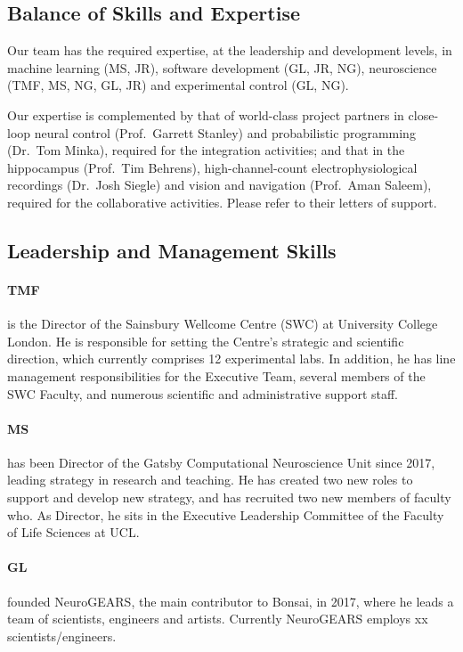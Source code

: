 \subsection*{Balance of Skills and Expertise}

Our team has the required expertise, at the leadership and development levels,
in machine learning (MS, JR), software development (GL, JR, NG), neuroscience
(TMF, MS, NG, GL, JR) and experimental control (GL, NG).

Our expertise is complemented by that of world-class project partners in
close-loop neural control (Prof.~Garrett Stanley) and probabilistic programming
(Dr.~Tom Minka), required for the integration activities; and that in the
hippocampus (Prof.~Tim Behrens), high-channel-count electrophysiological
recordings (Dr.~Josh Siegle) and vision and navigation (Prof.~Aman Saleem),
required for the collaborative activities. Please refer to their letters of
support.

\subsection*{Leadership and Management Skills}

\paragraph{TMF} is the Director of the Sainsbury Wellcome Centre (SWC) at
University College London. He is responsible for setting the Centre’s strategic
and scientific direction, which currently comprises 12 experimental labs. In
addition, he has line management responsibilities for the Executive Team,
several members of the SWC Faculty, and numerous scientific and administrative
support staff.

\paragraph{MS} has been Director of the Gatsby Computational
Neuroscience Unit since 2017, leading strategy in research and teaching. He has
created two new roles to support and develop new strategy, and has recruited
two new members of faculty who.  As Director, he sits in the Executive
Leadership Committee of the Faculty of Life Sciences at UCL.

\paragraph{GL} founded NeuroGEARS, the main contributor to
Bonsai, in 2017, where he leads a team of scientists, engineers and artists.
Currently NeuroGEARS employs xx scientists/engineers.

